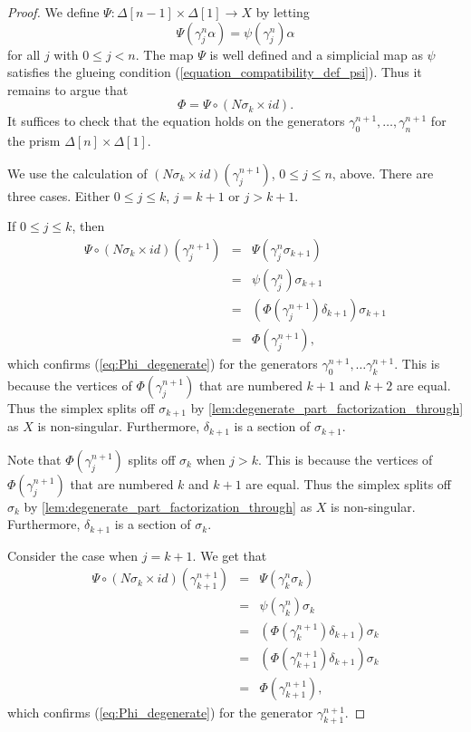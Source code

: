 \begin{proof}
We define $\Psi :\Delta [n-1]\times \Delta [1]\to X$ by letting
\[\Psi (\gamma ^n_j\alpha )=\psi (\gamma ^n_j)\alpha\]
for all $j$ with $0\leq j<n$. The map $\Psi$ is well defined and a simplicial map as $\psi$ satisfies the glueing condition (\ref{equation_compatibility_def_psi}). Thus it remains to argue that
\begin{equation}\label{eq:Phi_degenerate}
\Phi =\Psi \circ (N\sigma _k\times id).
\end{equation}
It suffices to check that the equation holds on the generators $\gamma ^{n+1}_0,\dots ,\gamma ^{n+1}_n$ for the prism $\Delta [n]\times \Delta [1]$.

We use the calculation of $(N\sigma _k\times id)(\gamma ^{n+1}_j)$, $0\leq j\leq n$, above. There are three cases. Either $0\leq j\leq k$, $j=k+1$ or $j>k+1$.

If $0\leq j\leq k$, then
\begin{displaymath}
\begin{array}{rcl}
\Psi \circ (N\sigma _k\times id)(\gamma ^{n+1}_j) & = & \Psi (\gamma ^n_j\sigma _{k+1}) \\
& = & \psi (\gamma ^n_j)\sigma _{k+1} \\
& = & (\Phi (\gamma ^{n+1}_j)\delta _{k+1})\sigma _{k+1} \\
& = & \Phi (\gamma ^{n+1}_j),
\end{array}
\end{displaymath}
which confirms (\ref{eq:Phi_degenerate}) for the generators $\gamma ^{n+1}_0, \dots \gamma ^{n+1}_k$. This is because the vertices of $\Phi (\gamma ^{n+1}_j)$ that are numbered $k+1$ and $k+2$ are equal. Thus the simplex splits off $\sigma _{k+1}$ by \cref{lem:degenerate_part_factorization_through} as $X$ is non-singular. Furthermore, $\delta _{k+1}$ is a section of $\sigma _{k+1}$.

Note that $\Phi (\gamma ^{n+1}_j)$ splits off $\sigma _k$ when $j>k$. This is because the vertices of $\Phi (\gamma ^{n+1}_j)$ that are numbered $k$ and $k+1$ are equal. Thus the simplex splits off $\sigma _k$ by \cref{lem:degenerate_part_factorization_through} as $X$ is non-singular. Furthermore, $\delta _{k+1}$ is a section of $\sigma _k$.

Consider the case when $j=k+1$. We get that
\begin{displaymath}
\begin{array}{rcl}
\Psi \circ (N\sigma _k\times id)(\gamma ^{n+1}_{k+1}) & = & \Psi (\gamma ^n_k\sigma _k) \\
& = & \psi (\gamma ^n_k)\sigma _k \\
& = & (\Phi (\gamma ^{n+1}_k)\delta _{k+1})\sigma _k \\
& = & (\Phi (\gamma ^{n+1}_{k+1})\delta _{k+1})\sigma _k \\
& = & \Phi (\gamma ^{n+1}_{k+1}),
\end{array}
\end{displaymath}
which confirms (\ref{eq:Phi_degenerate}) for the generator $\gamma ^{n+1}_{k+1}$.


\end{proof}
